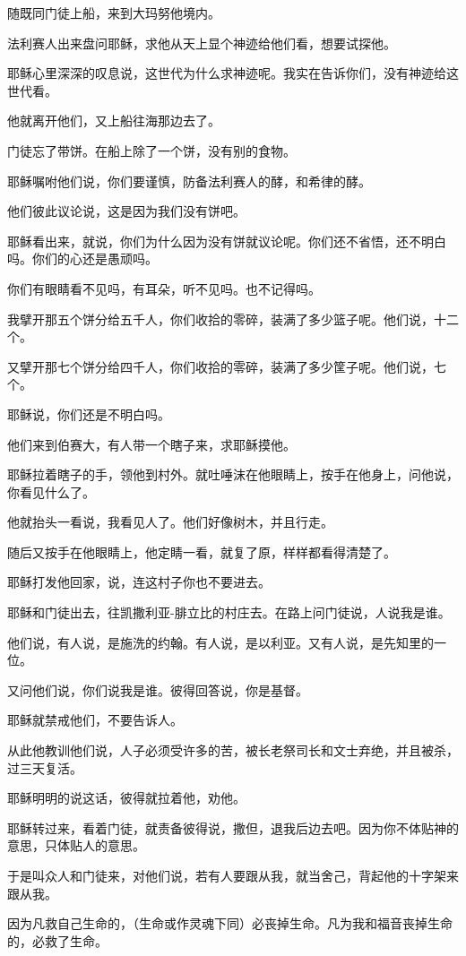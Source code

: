\documentclass[12pt,oneside]{book}
\begin{document}
随既同门徒上船，来到大玛努他境内。

法利赛人出来盘问耶稣，求他从天上显个神迹给他们看，想要试探他。

耶稣心里深深的叹息说，这世代为什么求神迹呢。我实在告诉你们，没有神迹给这世代看。

他就离开他们，又上船往海那边去了。

门徒忘了带饼。在船上除了一个饼，没有别的食物。

耶稣嘱咐他们说，你们要谨慎，防备法利赛人的酵，和希律的酵。

他们彼此议论说，这是因为我们没有饼吧。

耶稣看出来，就说，你们为什么因为没有饼就议论呢。你们还不省悟，还不明白吗。你们的心还是愚顽吗。

你们有眼睛看不见吗，有耳朵，听不见吗。也不记得吗。

我擘开那五个饼分给五千人，你们收拾的零碎，装满了多少篮子呢。他们说，十二个。

又擘开那七个饼分给四千人，你们收拾的零碎，装满了多少筐子呢。他们说，七个。

耶稣说，你们还是不明白吗。

他们来到伯赛大，有人带一个瞎子来，求耶稣摸他。

耶稣拉着瞎子的手，领他到村外。就吐唾沫在他眼睛上，按手在他身上，问他说，你看见什么了。

他就抬头一看说，我看见人了。他们好像树木，并且行走。

随后又按手在他眼睛上，他定睛一看，就复了原，样样都看得清楚了。

耶稣打发他回家，说，连这村子你也不要进去。

耶稣和门徒出去，往凯撒利亚-腓立比的村庄去。在路上问门徒说，人说我是谁。

他们说，有人说，是施洗的约翰。有人说，是以利亚。又有人说，是先知里的一位。

又问他们说，你们说我是谁。彼得回答说，你是基督。

耶稣就禁戒他们，不要告诉人。

从此他教训他们说，人子必须受许多的苦，被长老祭司长和文士弃绝，并且被杀，过三天复活。

耶稣明明的说这话，彼得就拉着他，劝他。

耶稣转过来，看着门徒，就责备彼得说，撒但，退我后边去吧。因为你不体贴神的意思，只体贴人的意思。

于是叫众人和门徒来，对他们说，若有人要跟从我，就当舍己，背起他的十字架来跟从我。

因为凡救自己生命的，（生命或作灵魂下同）必丧掉生命。凡为我和福音丧掉生命的，必救了生命。
\end{document}
